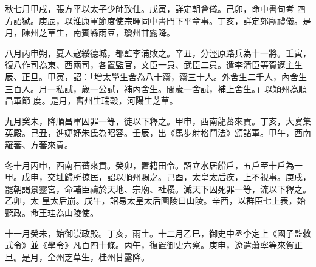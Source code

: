 \begin{pinyinscope}
 秋七月甲戌，張方平以太子少師致仕。戊寅，詳定朝會儀。己卯，命中書句考
 四方詔獄。庚辰，以淮康軍節度使宗暉同中書門下平章事。丁亥，詳定郊廟禮儀。是月，陳州芝草生，南賓縣雨豆，瓊州甘露降。



 八月丙申朔，夏人寇綏德城，都監李浦敗之。辛丑，分涇原路兵為十一將。壬寅，復八作司為東、西兩司，各置監官，文臣一員、武臣二員。遣李清臣等賀遼主生辰、正旦。甲寅，詔：「增太學生舍為八十齋，齋三十人。外舍生二千人，內舍生三百人。月一私試，歲一公試，補內舍生。間歲一舍試，補上舍生。」以穎州為順昌軍節
 度。是月，曹州生瑞穀，河陽生芝草。



 九月癸未，降順昌軍囚罪一等，徒以下釋之。甲申，西南龍蕃來貢。丁亥，大宴集英殿。己丑，進婕妤朱氏為昭容。壬辰，出《馬步射格鬥法》頒諸軍。甲午，西南羅蕃、方蕃來貢。



 冬十月丙申，西南石蕃來貢。癸卯，置籍田令。詔立水居船戶，五戶至十戶為一甲。戊申，交址歸所掠民，詔以順州賜之。己酉，太皇太后疾，上不視事。庚戌，罷朝謁景靈宮，命輔臣禱於天地、宗廟、社稷。減天下囚死罪一等，流以下釋之。乙卯，太
 皇太后崩。戊午，詔易太皇太后園陵曰山陵。辛酉，以群臣七上表，始聽政。命王珪為山陵使。



 十一月癸未，始御崇政殿。丁亥，雨土。十二月乙巳，御史中丞李定上《國子監敕式令》並《學令》凡百四十條。丙午，復置御史六察。庚申，遼遣蕭寧等來賀正旦。是月，全州芝草生，桂州甘露降。



\end{pinyinscope}